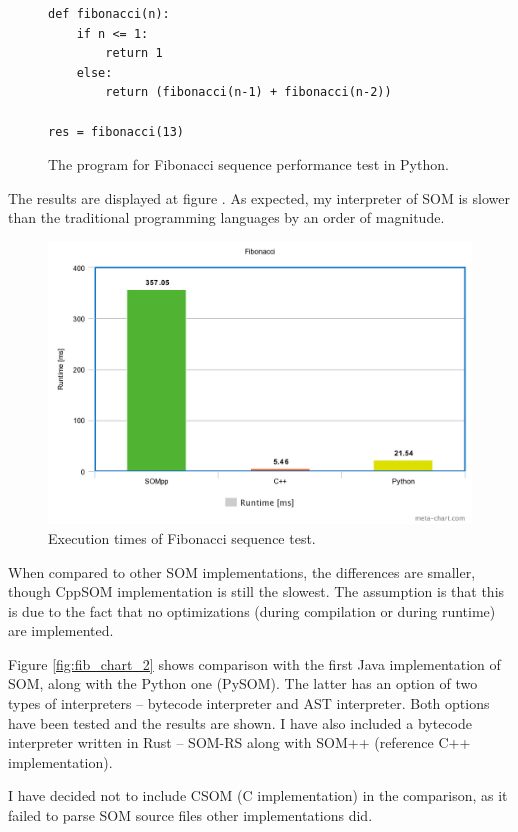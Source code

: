 \documentclass[thesis=M,english]{FITthesis}[2019/12/23]
\begin{document}
\begin{figure}
	\centering
	\begin{verbatim}
def fibonacci(n):
    if n <= 1:
	    return 1
	else:
        return (fibonacci(n-1) + fibonacci(n-2))

res = fibonacci(13)
	\end{verbatim}
	\caption{The program for Fibonacci sequence performance test in Python.}
	\label{fig:fib_py}
\end{figure}

The results are displayed at figure . As expected, my interpreter of SOM is slower than the traditional programming languages by an order of magnitude.
\begin{figure}
	\centering
	\includegraphics[width=\linewidth]{media/fib_chart_1.png}
	\caption{Execution times of Fibonacci sequence test.}
	\label{fig:fib_chart}
\end{figure}

When compared to other SOM implementations, the differences are smaller, though CppSOM implementation is still the slowest. The assumption is that this is
due to the fact that no optimizations (during compilation or during runtime) are implemented. 

Figure \ref{fig:fib_chart_2} shows comparison with the first Java implementation of SOM, along with the Python one (PySOM). The latter has an option of two types
of interpreters -- bytecode interpreter and AST interpreter. Both options have been tested and the results are shown. I have also included a bytecode
interpreter written in Rust -- SOM-RS along with SOM++ (reference C++ implementation).

I have decided not to include CSOM (C implementation) in the comparison, as it failed to parse SOM source files other implementations did. 
\end{document}
